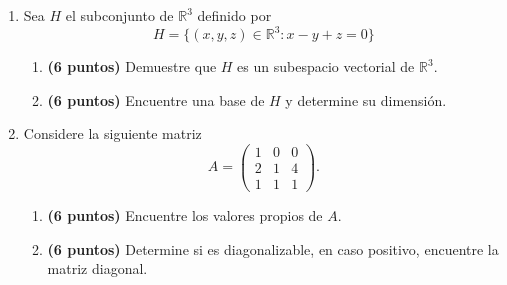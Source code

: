 \documentclass[a4paper]{article}
\begin{document}
\begin{enumerate}
\newpage
    \item Sea $H$ el subconjunto de $\mathbb{R}^3$ definido por
\[H=\{(x,y,z)\in\mathbb{R}^3\colon x-y+z=0  \}\]

\begin{enumerate}
    \item {\bf (6 puntos)} Demuestre que $H$ es un subespacio vectorial de $\mathbb{R}^3$.
    \item {\bf (6 puntos)} Encuentre una base de $H$ y determine su dimensión.

\end{enumerate}

\newpage
    \item Considere la siguiente matriz
\[    A=\begin{pmatrix} 1 &0 & 0 \\ 2 & 1 & 4 \\ 1 & 1 & 1 \end{pmatrix}.\]
\begin{enumerate}
    \item {\bf (6 puntos)} Encuentre los valores propios de $A$.
    \item {\bf (6 puntos)} Determine si es diagonalizable, en caso positivo, encuentre la matriz diagonal.
\end{enumerate}
\end{enumerate}
\end{document}
